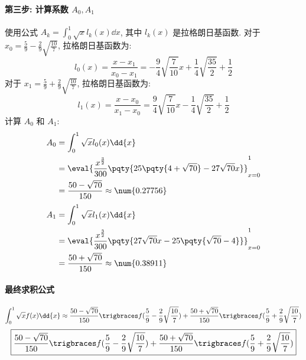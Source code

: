 \documentclass[lang = zh]{iwork}
\begin{document}
\begin{sol}
  \paragraph{第三步: 计算系数 $A_0, A_1$}
  使用公式 $A_k = \int_0^1 \sqrt{x} l_k(x) \dd{x}$, 其中 $l_k(x)$ 是拉格朗日基函数.
  对于 $x_0 = \frac{5}{9} - \frac{2}{9} \sqrt{\frac{10}{7}}$, 拉格朗日基函数为:
  \begin{equation*}
    l_0(x)
    = \frac{x - x_1}{x_0 - x_1}
    = - \frac{9}{4} \sqrt{\frac{7}{10}} x + \frac{1}{4} \sqrt{\frac{35}{2}} + \frac{1}{2}
  \end{equation*}
  对于 $x_1 = \frac{5}{9} + \frac{2}{9} \sqrt{\frac{10}{7}}$, 拉格朗日基函数为:
  \begin{equation*}
    l_1(x)
    = \frac{x - x_0}{x_1 - x_0}
    = \frac{9}{4} \sqrt{\frac{7}{10}} x - \frac{1}{4} \sqrt{\frac{35}{2}} + \frac{1}{2}
  \end{equation*}
  计算 $A_0$ 和 $A_1$:
  \begin{equation*}
    \begin{split}
      A_0
       & = \int_0^1 \sqrt{x} l_0(x) \dd{x}                                                              \\
       & = \eval{\frac{x^{\frac{3}{2}}}{300} \pqty{25 \pqty{4 + \sqrt{70}} - 27 \sqrt{70} x}}_{x = 0}^1 \\
       & = \frac{50 - \sqrt{70}}{150}
      \approx \num{0.27756}
    \end{split}
  \end{equation*}
  \begin{equation*}
    \begin{split}
      A_1
       & = \int_0^1 \sqrt{x} l_1(x) \dd{x}                                                              \\
       & = \eval{\frac{x^{\frac{3}{2}}}{300} \pqty{27 \sqrt{70} x - 25 \pqty{\sqrt{70} - 4}}}_{x = 0}^1 \\
       & = \frac{50 + \sqrt{70}}{150}
      \approx \num{0.38911}
    \end{split}
  \end{equation*}

  \paragraph{最终求积公式}
  \begin{equation*}
    \int_0^1 \sqrt{x} f(x) \dd{x} \approx \frac{50 - \sqrt{70}}{150} \f(\frac{5}{9} - \frac{2}{9} \sqrt{\frac{10}{7}}) + \frac{50 + \sqrt{70}}{150} \f(\frac{5}{9} + \frac{2}{9} \sqrt{\frac{10}{7}})
  \end{equation*}
  \begin{equation*}
    \boxed{\frac{50 - \sqrt{70}}{150} \f(\frac{5}{9} - \frac{2}{9} \sqrt{\frac{10}{7}}) + \frac{50 + \sqrt{70}}{150} \f(\frac{5}{9} + \frac{2}{9} \sqrt{\frac{10}{7}})}
  \end{equation*}
\end{sol}
\end{document}
